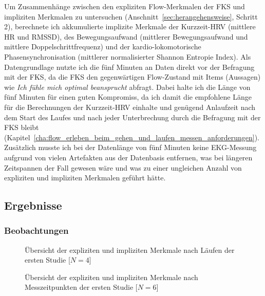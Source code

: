 Um Zusammenhänge zwischen den expliziten Flow-Merkmalen der \ac{FKS} und impliziten Merkmalen zu untersuchen (Anschnitt~\ref{sec:herangehensweise}, Schritt 2), berechnete ich akkumulierte implizite Merkmale der Kurzzeit-\ac{HRV} (mittlere \ac{HR} und \acs{RMSSD}), des Bewegungsaufwand (mittlerer Bewegungsaufwand und mittlere Doppelschrittfrequenz) und der kardio-lokomotorische Phasensynchronisation (mittlerer normalisierter Shannon Entropie Index). Als Datengrundlage nutzte ich die fünf Minuten an Daten direkt vor der Befragung mit der \ac{FKS}, da die \ac{FKS} den gegenwärtigen Flow-Zustand mit Items (Aussagen) wie \emph{Ich fühle mich optimal beansprucht} abfragt. Dabei halte ich die Länge von fünf Minuten für einen guten Kompromiss, da ich damit die empfohlene Länge für die Berechnungen der Kurzzeit-\ac{HRV} \citep[][S.~360]{TaskForce1996} einhalte und genügend Anlaufzeit nach dem Start des Laufes und nach jeder Unterbrechung durch die Befragung mit der \ac{FKS} bleibt (Kapitel~\ref{cha:flow_erleben_beim_gehen_und_laufen_messen_anforderungen}). Zusätzlich musste ich bei der Datenlänge von fünf Minuten keine \ac{EKG}-Messung aufgrund von vielen Artefakten aus der Datenbasis entfernen, was bei längeren Zeitspannen der Fall gewesen wäre und was zu einer ungleichen Anzahl von expliziten und impliziten Merkmalen geführt hätte.

\subsection{Ergebnisse} 

\label{sub:ergebnisse_5_1}

\subsubsection{Beobachtungen} 

\label{ssub:beobachtungen_5_1} 
\begin{figure}
	[!htb]  \caption[Übersicht der expliziten und impliziten Merkmale nach Läufen der ersten Studie]{Übersicht der expliziten und impliziten Merkmale nach Läufen der ersten Studie [$N = 4$]} \label{fig:ubersicht_nach_laufen_1} 
\end{figure}
\begin{figure}
	[!htb]  \caption[Übersicht der expliziten und impliziten Merkmale nach Messzeitpunkten der ersten Studie]{Übersicht der expliziten und impliziten Merkmale nach Messzeitpunkten der ersten Studie [$N = 6$]} \label{fig:ubersicht_nach_messzeitpunkten_1} 
\end{figure}


